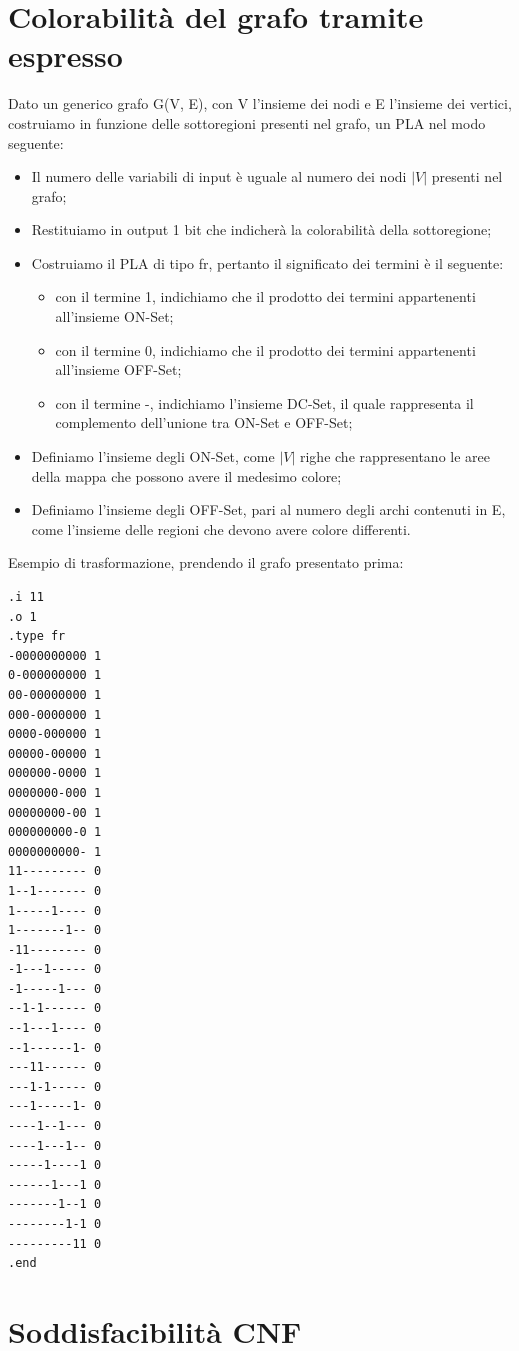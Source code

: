 \documentclass[a4paper,11pt]{article} %
\begin{document}
\section{Colorabilità del grafo tramite espresso}

Dato un generico grafo G(V, E), con V l’insieme dei nodi e E l’insieme dei vertici, costruiamo in funzione delle
sottoregioni presenti nel grafo, un PLA nel modo seguente:
\begin{itemize}
	\item Il numero delle variabili di input è uguale al numero dei nodi $|V|$ presenti nel grafo;
	\item Restituiamo in output 1 bit che indicherà la colorabilità della sottoregione;
	\item Costruiamo il PLA di tipo fr, pertanto il significato dei termini è il seguente:
	\begin{itemize}
		\item con il termine 1, indichiamo che il prodotto dei termini appartenenti all’insieme ON-Set;
		\item con il termine 0, indichiamo che il prodotto dei termini appartenenti all’insieme OFF-Set;
		\item con il termine -, indichiamo l’insieme DC-Set, il quale rappresenta il complemento dell’unione tra ON-Set e OFF-Set;
	\end{itemize}
	\item Definiamo l’insieme degli ON-Set, come $|V|$ righe che rappresentano le aree della mappa che possono avere il medesimo colore;
	\item Definiamo l’insieme degli OFF-Set, pari al numero degli archi contenuti in E, come l’insieme delle regioni
	che devono avere colore differenti.
\end{itemize}
Esempio di trasformazione, prendendo il grafo presentato prima:
\begin{verbatim}
.i 11
.o 1
.type fr
-0000000000 1
0-000000000 1
00-00000000 1
000-0000000 1
0000-000000 1
00000-00000 1
000000-0000 1
0000000-000 1
00000000-00 1
000000000-0 1
0000000000- 1
11--------- 0
1--1------- 0
1-----1---- 0
1-------1-- 0
-11-------- 0
-1---1----- 0
-1-----1--- 0
--1-1------ 0
--1---1---- 0
--1------1- 0
---11------ 0
---1-1----- 0
---1-----1- 0
----1--1--- 0
----1---1-- 0
-----1----1 0
------1---1 0
-------1--1 0
--------1-1 0
---------11 0
.end
\end{verbatim}

\pagebreak

\section{Soddisfacibilità CNF}
\end{document}
